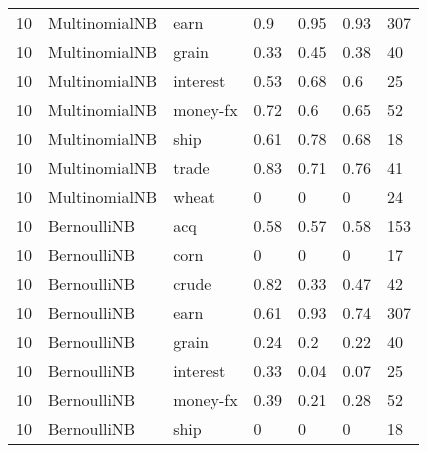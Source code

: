 \documentclass{article}
\begin{document}
\begin{table}[h]
\begin{tabular}{lllllll}
10            & MultinomialNB          & earn            & 0.9                & 0.95            & 0.93              & 307              \\
10            & MultinomialNB          & grain           & 0.33               & 0.45            & 0.38              & 40               \\
10            & MultinomialNB          & interest        & 0.53               & 0.68            & 0.6               & 25               \\
10            & MultinomialNB          & money-fx        & 0.72               & 0.6             & 0.65              & 52               \\
10            & MultinomialNB          & ship            & 0.61               & 0.78            & 0.68              & 18               \\
10            & MultinomialNB          & trade           & 0.83               & 0.71            & 0.76              & 41               \\
10            & MultinomialNB          & wheat           & 0                  & 0               & 0                 & 24               \\
10            & BernoulliNB            & acq             & 0.58               & 0.57            & 0.58              & 153              \\
10            & BernoulliNB            & corn            & 0                  & 0               & 0                 & 17               \\
10            & BernoulliNB            & crude           & 0.82               & 0.33            & 0.47              & 42               \\
10            & BernoulliNB            & earn            & 0.61               & 0.93            & 0.74              & 307              \\
10            & BernoulliNB            & grain           & 0.24               & 0.2             & 0.22              & 40               \\
10            & BernoulliNB            & interest        & 0.33               & 0.04            & 0.07              & 25               \\
10            & BernoulliNB            & money-fx        & 0.39               & 0.21            & 0.28              & 52               \\
10            & BernoulliNB            & ship            & 0                  & 0               & 0                 & 18               \\

\end{tabular}
\end{table}
\end{document}
